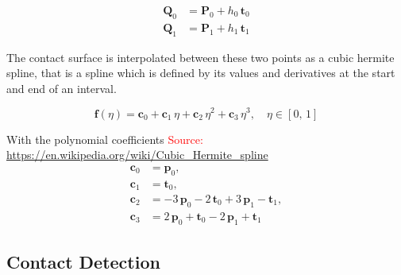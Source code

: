 \begin{align*}
\boldsymbol{Q}_0 &= \boldsymbol{P}_0 + h_0\,\boldsymbol{t}_0 \\
\boldsymbol{Q}_1 &= \boldsymbol{P}_1 + h_1\,\boldsymbol{t}_1
\end{align*}

The contact surface is interpolated between these two points as a cubic hermite spline, that is a spline which is defined by its values and derivatives at the start and end of an interval.

\begin{equation}
\boldsymbol{f}(\eta) = \boldsymbol{c}_0 + \boldsymbol{c}_1\,\eta + \boldsymbol{c}_2\,\eta^2 + \boldsymbol{c}_3\,\eta^3,\quad \eta \in [0,\,1]
\end{equation}

With the polynomial coefficients \textcolor{red}{Source: \url{https://en.wikipedia.org/wiki/Cubic_Hermite_spline}}
%
\begin{align*}
\boldsymbol{c}_0 &= \boldsymbol{p}_0,\\
\boldsymbol{c}_1 &= \boldsymbol{t}_0,\\
\boldsymbol{c}_2 &= -3\,\boldsymbol{p}_0 - 2\,\boldsymbol{t}_0 + 3\,\boldsymbol{p}_1 - \boldsymbol{t}_1,\\
\boldsymbol{c}_3 &= 2\,\boldsymbol{p}_0 + \boldsymbol{t}_0 - 2\,\boldsymbol{p}_1 + \boldsymbol{t}_1
\end{align*}













































\newpage


\subsection{Contact Detection}

